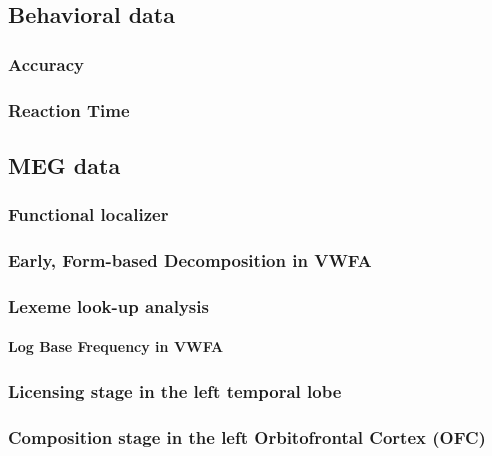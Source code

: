 \documentclass[
]{article}
\let\oldparagraph\paragraph
\renewcommand{\paragraph}[1]{\oldparagraph{#1}\mbox{}}
\begin{document}
\subsection{Behavioral data}\label{behavioral-data}

\subsubsection{Accuracy}\label{accuracy}

\subsubsection{Reaction Time}\label{reaction-time}

\subsection{MEG data}\label{meg-data-1}

\subsubsection{Functional localizer}\label{functional-localizer}

\subsubsection{Early, Form-based Decomposition in
VWFA}\label{early-form-based-decomposition-in-vwfa}

\subsubsection{Lexeme look-up analysis}\label{lexeme-look-up-analysis}

\paragraph{Log Base Frequency in VWFA}\label{log-base-frequency-in-vwfa}

\subsubsection{Licensing stage in the left temporal
lobe}\label{licensing-stage-in-the-left-temporal-lobe}

\subsubsection{Composition stage in the left Orbitofrontal Cortex
(OFC)}\label{composition-stage-in-the-left-orbitofrontal-cortex-ofc}
\end{document}

